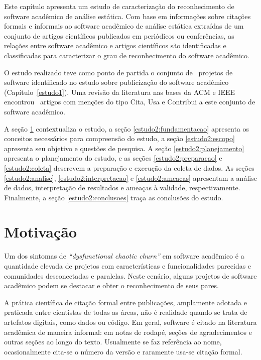 {}\label{estudo2}

Este capítulo apresenta um estudo de caracterização do reconhecimento de
software acadêmico de análise estática.  Com base em informações sobre citações
formais e informais ao software acadêmico de análise estática extraídas de um
conjunto de artigos científicos publicados em periódicos ou conferências, as
relações entre software acadêmico e artigos científicos são identificadas e
classificadas para caracterizar o grau de reconhecimento do software acadêmico.

O estudo realizado teve como ponto de partida o conjunto de \SoftwareCount \
projetos de software identificado no estudo sobre publicização do software
acadêmico (Capítulo~\ref{estudo1}).  Uma revisão da literatura nas bases da ACM
e IEEE encontrou \SearchUniqueCount \ artigos com menções do tipo Cita, Usa e
Contribui a este conjunto de software acadêmico.

A seção \ref{estudo2:introducao} contextualiza o estudo,
a seção \ref{estudo2:fundamentacao} apresenta os conceitos necessários para compreensão do estudo,
a seção \ref{estudo2:escopo} apresenta seu objetivo e questões de pesquisa.
A seção \ref{estudo2:planejamento} apresenta o planejamento do estudo, e
as seções \ref{estudo2:preparacao} e \ref{estudo2:coleta} descrevem a preparação e execução da coleta de dados.
As seções \ref{estudo2:analise}, \ref{estudo2:interpretacao} e \ref{estudo2:ameacas}
apresentam a análise de dados, interpretação de resultados e ameaças à validade, respectivamente.
Finalmente, a seção \ref{estudo2:conclusoes} traça as conclusões do estudo.

\section{Motivação} \label{estudo2:introducao} %

Um dos sintomas de 
{\it ``dysfunctional chaotic churn''} \cite{howison2015understanding}
em software acadêmico é a quantidade elevada de projetos 
com características e funcionalidades parecidas
e comunidades desconectadas e paralelas.
Neste cenário, alguns projetos de software acadêmico
podem se destacar e obter o reconhecimento de seus pares.

A prática científica de citação formal entre publicações, amplamente
adotada e praticada entre cientistas de todas as áreas, não é realidade quando
se trata de artefatos digitais, como dados ou código.
Em geral, software é citado na literatura acadêmica
de maneira informal: em notas de rodapé, seções de agradecimentos e outras
seções ao longo do texto. Usualmente se faz referência ao nome, ocasionalmente
cita-se o número da versão e raramente usa-se citação formal.

